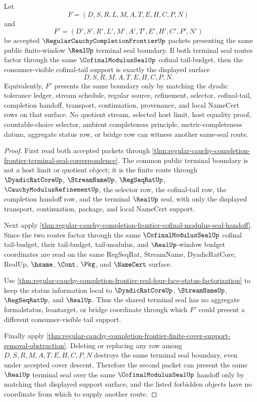 \begin{theorem}
\label{thm:regular-cauchy-completion-frontier-cofinal-tail-support-uniqueness}
Let
$$
F=(D,S,R,L,M,A,T,E,H,C,P,N)
$$
and
$$
F'=(D',S',R',L',M',A',T',E',H',C',P',N')
$$
be accepted $\RegularCauchyCompletionFrontierUp$ packets presenting the same public finite-window $\RealUp$ terminal seal boundary. If both terminal seal routes factor through the same $\CofinalModulusSealUp$ cofinal tail-budget, then the consumer-visible cofinal-tail support is exactly the displayed surface
$$
D,S,R,M,A,T,E,H,C,P,N.
$$
Equivalently, $F'$ presents the same boundary only by matching the dyadic tolerance ledger, stream schedule, regular source, refinement, selector, cofinal-tail, completion handoff, transport, continuation, provenance, and local NameCert rows on that surface. No quotient stream, selected host limit, host equality proof, countable-choice selector, ambient completeness principle, metric-completeness datum, aggregate status row, or bridge row can witness another same-seal route.
\end{theorem}
\begin{proof}
First read both accepted packets through \autoref{thm:regular-cauchy-completion-frontier-terminal-seal-correspondence}. The common public terminal boundary is not a host limit or quotient object; it is the finite route through $\DyadicRatCoreUp$, $\StreamNameUp$, $\RegSeqRatUp$, $\CauchyModulusRefinementUp$, the selector row, the cofinal-tail row, the completion handoff row, and the terminal $\RealUp$ seal, with only the displayed transport, continuation, package, and local NameCert support.

Next apply \autoref{thm:regular-cauchy-completion-frontier-cofinal-modulus-seal-handoff}. Since the two routes factor through the same $\CofinalModulusSealUp$ cofinal tail-budget, their tail-budget, tail-modulus, and $\RealUp$-window budget coordinates are read on the same RegSeqRat, StreamName, DyadicRatCore, RealUp, $\hsame$, $\Cont$, $\Pkg$, and $\NameCert$ surface.

Use \autoref{thm:regular-cauchy-completion-frontier-real-four-face-status-factorization} to keep the status information local to $\DyadicRatCoreUp$, $\StreamNameUp$, $\RegSeqRatUp$, and $\RealUp$. Thus the shared terminal seal has no aggregate formalstatus, leantarget, or bridge coordinate through which $F'$ could present a different consumer-visible tail support.

Finally apply \autoref{thm:regular-cauchy-completion-frontier-finite-cover-support-removal-obstruction}. Deleting or replacing any row among $D,S,R,M,A,T,E,H,C,P,N$ destroys the same terminal seal boundary, even under accepted cover descent. Therefore the second packet can present the same $\RealUp$ terminal seal over the same $\CofinalModulusSealUp$ handoff only by matching that displayed support surface, and the listed forbidden objects have no coordinate from which to supply another route.
\end{proof}

